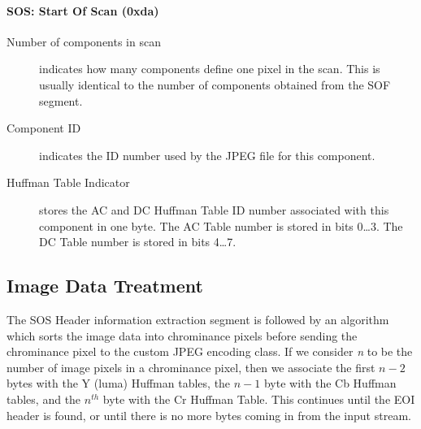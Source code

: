 \paragraph*{SOS: Start Of Scan (0xda)}
\begin{description}
	\item[Number of components in scan] indicates how many components define one pixel in the scan. 
		This is usually identical to  the number of components obtained from the SOF segment.
	\item[Component ID] indicates the ID number used by the JPEG file for this component.\footnotemark[1] 
	\item[Huffman Table Indicator] stores the AC and DC Huffman Table ID number associated with this component in one byte. 
		The AC Table number is stored in bits 0\ldots3. The DC Table number is stored in bits 4\ldots7.\footnotemark[1]
\end{description}

\subsection{Image Data Treatment}

The SOS Header information extraction segment is followed by 
an algorithm which sorts the image data into chrominance pixels before 
sending the chrominance pixel to the custom JPEG encoding class. 
If we consider \emph{n} to be the number of image pixels in a chrominance pixel, then 
we associate the first $n - 2$ bytes with the Y (luma) Huffman tables, the $n - 1$ byte with the Cb Huffman tables, and 
the $n^{th}$ byte with the Cr Huffman Table. 
This continues until the EOI header is found, or until there is no more bytes coming in from the input stream.
